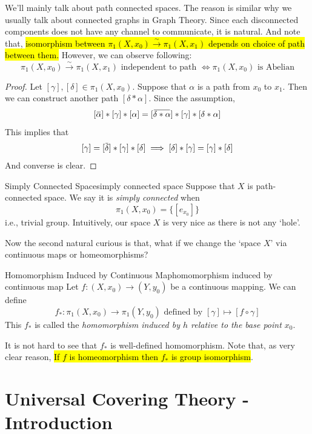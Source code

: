 \documentclass[12pt, a4paper, twoside]{article}
\newcommand{\overbar}[1]{\mkern 1.5mu\overline{\mkern-1.5mu#1\mkern-1.5mu}\mkern 1.5mu}
\theoremstyle{plain}
\begin{document}
We'll mainly talk about path connected spaces. The reason is similar why we usually talk about connected graphs in Graph Theory. 
Since each disconnected components does not have any channel to communicate, it is natural. 
And note that, \hl{isomorphism between $\pi_1(X, x_0) \xrightarrow{\sim} \pi_1(X, x_1)$ depends on choice of path between them.}
However, we can observe following: 
\[\pi_1(X, x_0) \xrightarrow{\sim} \pi_1(X, x_1) \text{ independent to path } \iff \pi_1(X, x_0) \text{ is Abelian}\]

\begin{proof}
Let $[\gamma], [\delta] \in \pi_1(X, x_0)$. Suppose that $\alpha$ is a path from $x_0$ to $x_1$. Then we can construct another path $[\delta * \alpha]$. 
Since the assumption, 
\[[\overbar{\alpha}] * [\gamma] * [\alpha] = [\overbar{\delta * \alpha}] * [\gamma] * [\delta * \alpha]\]
This implies that 
\[[\gamma] = [\overbar{\delta}] * [\gamma] * [\delta] \implies [\delta] * [\gamma] = [\gamma] * [\delta]\]
And converse is clear. 
\end{proof}

\begin{defn}{Simply Connected Space}{simply connected space}
    Suppose that $X$ is path-connected space. We say it is \textit{simply connected} when 
    \[\pi_1(X, x_0) = \{[e_{x_0}]\}\]
    i.e., trivial group. Intuitively, our space $X$ is very nice as there is not any \lq hole'. 
\end{defn}

Now the second natural curious is that, what if we change the \lq space $X$' via continuous maps or homeomorphisms? 

\begin{defn}{Homomorphism Induced by Continuous Map}{homomorphism induced by continuous map}
    Let $f: (X, x_0) \rightarrow (Y, y_0)$ be a continuous mapping. 
    We can define 
    \[f_*: \pi_1(X, x_0) \rightarrow \pi_1(Y, y_0) \text{ defined by } [\gamma] \mapsto [f \circ \gamma]\]
    This $f_*$ is called the \textit{homomorphism induced by $h$ relative to the base point $x_0$}. 
\end{defn}

It is not hard to see that $f_*$ is well-defined homomorphism. Note that, as very clear reason, \hl{If $f$ is homeomorphism then $f_*$ is group isomorphism}. 

\newpage 

\section{Universal Covering Theory - Introduction}
\end{document}
